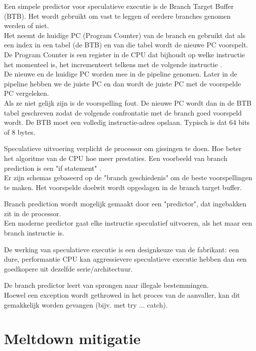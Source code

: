 Een simpele predictor voor speculatieve executie is de Branch Target Buffer (BTB). Het wordt gebruikt om vast te leggen of eerdere branches genomen werden of niet.\\
Het neemt de huidige PC (Program Counter) van de branch en gebruikt dat als een index in een tabel (de BTB) en van die tabel wordt de nieuwe PC voorspelt.\\
De Program Counter is een register in de CPU dat bijhoudt op welke instructie het momenteel is, het incrementeert telkens met de volgende instructie \parencite{Katzan1971}.\\
De nieuwe en de huidige PC worden mee in de pipeline genomen. Later in de pipeline hebben we de juiste PC en dan wordt de juiste PC met de voorspelde PC vergeleken.\\ Als ze niet gelijk zijn is de voorspelling fout. De nieuwe PC wordt dan in de BTB tabel geschreven zodat de volgende confrontatie met de branch goed voorspeld wordt.
De BTB moet een volledig instructie-adres opslaan. Typisch is dat 64 bits of 8 bytes.

Speculatieve uitvoering verplicht de processor om gissingen te doen. Hoe beter het algoritme van de CPU hoe meer prestaties. Een voorbeeld van branch prediction is een "if statement" \parencite{Kocher}.\\
Er zijn schemas gebaseerd op de "branch geschiedenis" om de beste voorspellingen te maken. Het voorspelde doelwit wordt opgeslagen in de branch target buffer.

Branch prediction wordt mogelijk gemaakt door een "predictor", dat ingebakken zit in de processor.\\
Een moderne predictor gaat elke instructie speculatief uitvoeren, als het maar een branch instructie is.

De werking van speculatieve executie is een designkeuze van de fabrikant: een dure, performantie CPU kan aggressievere speculatieve executie hebben dan een goedkopere uit dezelfde serie/architectuur.

De branch predictor leert van sprongen naar illegale
bestemmingen.\\
Hoewel een exception wordt gethrowed in
het proces van de aanvaller, kan dit gemakkelijk worden gevangen (bijv.
met try ... catch)\parencite{Kocher}.



\section{Meltdown mitigatie}
